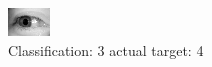 \begin{figure}[h!]
\begin{center}
\includegraphics[width=0.60\columnwidth]{figures/ID3192_class_3_target_4.png}
\end{center}
\caption{ Classification: 3 actual target: 4}
\label{fig:ID3192_class_3_target_4}
\end{figure}
